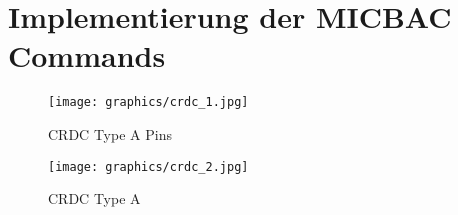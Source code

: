 \chapter{Implementierung der MICBAC Commands}
\label{ch:micbac}


\begin{figure}[H]
	\begin{minipage}{0.5\textwidth}
		\centering
		\texttt{[image: graphics/crdc\_1.jpg]}
		\caption{CRDC Type A Pins}
		\label{fig:crdc-pins}
	\end{minipage}
	\begin{minipage}{0.5\textwidth}
		\centering
		\texttt{[image: graphics/crdc\_2.jpg]}
		\caption{CRDC Type A}
		\label{fig:crdc_top}
	\end{minipage}
\end{figure}